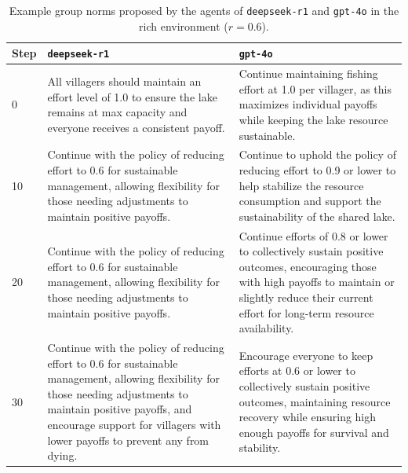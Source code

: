 \documentclass[sigconf]{aamas}
\begin{document}
\begin{appendix}
\begin{table}[t]
\caption{Example group norms proposed by the agents of \texttt{deepseek-r1} and \texttt{gpt-4o} in the rich environment ($r = 0.6$).}
\label{tab:group_norms}
\renewcommand{\arraystretch}{1.2}
\begin{tabularx}{\textwidth}{>{}lXX}
\toprule
Step & \texttt{deepseek-r1}                                                                                                                                                                                                                                                                                  & \texttt{gpt-4o}                                                                                                                                                                                               \\
\midrule
0    & All villagers should maintain an effort level of 1.0 to ensure the lake remains at max capacity and everyone receives a consistent payoff.                                                                                                                                                            & Continue maintaining fishing effort at 1.0 per villager, as this maximizes individual payoffs while keeping the lake resource sustainable.                                                          \\
\midrule
10   & Continue with the policy of reducing effort to 0.6 for sustainable management, allowing flexibility for those needing adjustments to maintain positive payoffs.                                                                                                                                       & Continue to uphold the policy of reducing effort to 0.9 or lower to help stabilize the resource consumption and support the sustainability of the shared lake.                                         \\
\midrule
20   & Continue with the policy of reducing effort to 0.6 for sustainable management, allowing flexibility for those needing adjustments to maintain positive payoffs.                                                                                                                                       & Continue efforts of 0.8 or lower to collectively sustain positive outcomes, encouraging those with high payoffs to maintain or slightly reduce their current effort for long-term resource availability.    \\
\midrule
30   & Continue with the policy of reducing effort to 0.6 for sustainable management, allowing flexibility for those needing adjustments to maintain positive payoffs, and encourage support for villagers with lower payoffs to prevent any from dying.                                                     & Encourage everyone to keep efforts at 0.6 or lower to collectively sustain positive outcomes, maintaining resource recovery while ensuring high enough payoffs for survival and stability.           \\

\end{tabularx}
\end{table}
\end{appendix}
\end{document}
